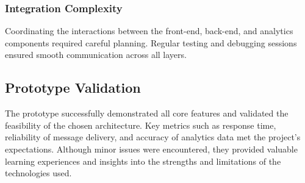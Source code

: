 \subsubsection{Integration Complexity}
Coordinating the interactions between the front-end, back-end, and analytics components required careful planning. Regular testing and debugging sessions ensured smooth communication across all layers.

\subsection{Prototype Validation}
The prototype successfully demonstrated all core features and validated the feasibility of the chosen architecture. Key metrics such as response time, reliability of message delivery, and accuracy of analytics data met the project’s expectations. Although minor issues were encountered, they provided valuable learning experiences and insights into the strengths and limitations of the technologies used.